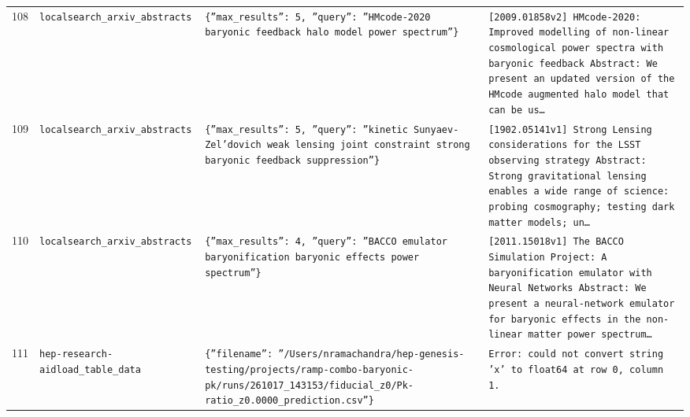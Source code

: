 \documentclass[11pt,a4paper]{article}
\begin{document}
\begin{longtable}{@{}p{}p{}p{}p{}@{}}
108 & \texttt{local}\newline\texttt{search\_\allowbreak{}arxiv\_\allowbreak{}abstracts} & \texttt{\{''max\_\allowbreak{}results'':\allowbreak{} 5,\allowbreak{} ''query'':\allowbreak{} ''HMcode-2020 baryonic feedback halo model power spectrum''\}\allowbreak{}} & \texttt{[2009.01858v2]\allowbreak{} HMcode-2020:\allowbreak{} Improved modelling of non-linear cosmological power spectra with baryonic feedback Abstract:\allowbreak{} We present an updated version of the HMcode augmented halo model that can be us\ldots{}\allowbreak{}} \\
109 & \texttt{local}\newline\texttt{search\_\allowbreak{}arxiv\_\allowbreak{}abstracts} & \texttt{\{''max\_\allowbreak{}results'':\allowbreak{} 5,\allowbreak{} ''query'':\allowbreak{} ''kinetic Sunyaev-Zel'dovich weak lensing joint constraint strong baryonic feedback suppression''\}\allowbreak{}} & \texttt{[1902.05141v1]\allowbreak{} Strong Lensing considerations for the LSST observing strategy Abstract:\allowbreak{} Strong gravitational lensing enables a wide range of science:\allowbreak{} probing cosmography;\allowbreak{} testing dark matter models;\allowbreak{} un\ldots{}\allowbreak{}} \\
110 & \texttt{local}\newline\texttt{search\_\allowbreak{}arxiv\_\allowbreak{}abstracts} & \texttt{\{''max\_\allowbreak{}results'':\allowbreak{} 4,\allowbreak{} ''query'':\allowbreak{} ''BACCO emulator baryonification baryonic effects power spectrum''\}\allowbreak{}} & \texttt{[2011.15018v1]\allowbreak{} The BACCO Simulation Project:\allowbreak{} A baryonification emulator with Neural Networks Abstract:\allowbreak{} We present a neural-network emulator for baryonic effects in the non-linear matter power spectrum\ldots{}\allowbreak{}} \\
111 & \texttt{hep-research-aid}\newline\texttt{load\_\allowbreak{}table\_\allowbreak{}data} & \texttt{\{''filename'':\allowbreak{} ''/\allowbreak{}Users/\allowbreak{}nramachandra/\allowbreak{}hep-genesis-testing/\allowbreak{}projects/\allowbreak{}ramp-combo-baryonic-pk/\allowbreak{}runs/\allowbreak{}261017\_\allowbreak{}143153/\allowbreak{}fiducial\_\allowbreak{}z0/\allowbreak{}Pk-ratio\_\allowbreak{}z0.0000\_\allowbreak{}prediction.csv''\}\allowbreak{}} & \texttt{Error:\allowbreak{} could not convert string 'x' to float64 at row 0,\allowbreak{} column 1.} \\

\end{longtable}
\end{document}

